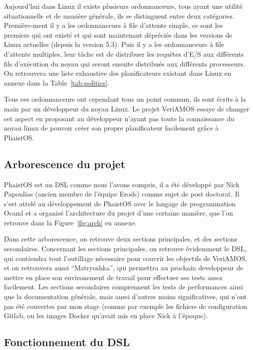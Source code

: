 Aujourd'hui dans Linux il existe plusieurs ordonnanceurs, tous ayant une 
utilité situationnelle et de manière générale, ils se distinguent entre deux 
catégories. Première-ment il y a les ordonnanceurs à file d'attente simple, ce 
sont les premiers qui ont existé et qui sont maintenant dépréciés dans les 
versions de Linux actuelles (depuis la version 5.3). Puis il y a les 
ordonnanceurs à file d'attente multiples, leur tâche est de distribuer les 
requêtes d'E/S aux différents fils d'exécution du noyau qui seront ensuite 
distribués aux différents processeurs. On retrouvera une liste exhaustive des 
planificateurs existant dans Linux en annexe dans la Table~\ref{tab:politics}.

Tous ces ordonnanceurs ont cependant tous un point commun, ils sont écrits à la 
main par un développeur du noyau Linux. Le projet VeriAMOS essaye de changer 
cet aspect en proposant au développeur n'ayant pas toute la connaissance du 
noyau linux de pouvoir créer son propre planificateur facilement grâce à 
PhaistOS. 

\subsection{Arborescence du projet}

PhaistOS est un DSL comme nous l'avons compris, il a été développé par Nick 
Papoulias (ancien membre de l'équipe Erods) comme sujet de post doctorat. Il 
s'est attelé au développement de PhaistOS avec le langage de programmation 
Ocaml et a organisé l'architecture du projet d'une certaine manière, que l'on 
retrouve dans la Figure~\ref{fig:arch} en annexe.

Dans cette arborescence, on retrouve deux sections principales, et des sections 
secondaires. Concernant les sections principales, on retrouve évidemment le 
DSL, qui contiendra tout l'outillage nécessaire pour couvrir les objectifs de 
VeriAMOS, et on retrouvera aussi ``Matryoshka'', qui permettra au prochain 
developpeur de mettre en place son environement de travail pour effectuer ses 
tests assez facilement. Les sections secondaires comprennent les tests de 
performances ainsi que la documentation générale, mais aussi d'autres moins 
significatives, qui n'ont pas été couvertes par mon stage (comme par exemple 
les fichiers de configuration Gitlab, ou les images Docker qu'avait mis en 
place Nick à l'époque).

\subsection{Fonctionnement du DSL}

